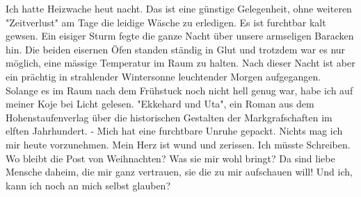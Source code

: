 \def\day{12. Februar 1943.}
\mktitle

Ich hatte Heizwache heut nacht.
Das ist eine g\"{u}nstige Gelegenheit, ohne weiteren "Zeitverlust" am Tage die leidige W\"{a}sche zu erledigen.
Es ist furchtbar kalt gewsen.
Ein eisiger Sturm fegte die ganze Nacht \"{u}ber unsere armseligen Baracken hin.
Die beiden eisernen \"{O}fen standen st\"{a}ndig in Glut und trotzdem war es nur m\"{o}glich, eine m\"{a}ssige Temperatur im Raum zu halten.
Nach dieser Nacht ist aber ein pr\"{a}chtig in strahlender Wintersonne leuchtender Morgen aufgegangen.
Solange es im Raum nach dem Fr\"{u}hstuck noch nicht hell genug war, habe ich auf meiner Koje bei Licht gelesen.
"Ekkehard und Uta", ein Roman aus dem Hohenstaufenverlag \"{u}ber die historischen Gestalten der Markgrafschaften im elften Jahrhundert.
- Mich hat eine furchtbare Unruhe gepackt.
Nichts mag ich mir heute vorzunehmen.
Mein Herz ist wund und zerissen.
Ich m\"{u}sste Schreiben.
Wo bleibt die Post von Weihnachten?
Was sie mir wohl bringt?
Da sind liebe Mensche daheim, die mir ganz vertrauen, sie die zu mir aufschauen will!
Und ich, kann ich noch an mich selbst glauben?

\clearpage
